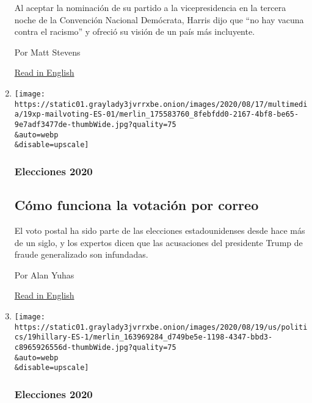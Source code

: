 \begin{enumerate}
  Al aceptar la nominación de su partido a la vicepresidencia en la
  tercera noche de la Convención Nacional Demócrata, Harris dijo que
  ``no hay vacuna contra el racismo'' y ofreció su visión de un país más
  incluyente.

  Por Matt Stevens

  \href{https://www.nytimes3xbfgragh.onion/2020/08/19/us/politics/kamala-harris-dnc-speech.html}{Read
  in English}
\item
  \href{/es/article/voto-por-correo.html}{}

  \texttt{[image: https://static01.graylady3jvrrxbe.onion/images/2020/08/17/multimedia/19xp-mailvoting-ES-01/merlin\_175583760\_8febfdd0-2167-4bf8-be65-9e7adf3477de-thumbWide.jpg?quality=75\\\&auto=webp\\\&disable=upscale]}

  \hypertarget{elecciones-2020-2}{%
  \subsubsection{Elecciones 2020}\label{elecciones-2020-2}}

  \hypertarget{cuxf3mo-funciona-la-votaciuxf3n-por-correo}{%
  \subsection{Cómo funciona la votación por
  correo}\label{cuxf3mo-funciona-la-votaciuxf3n-por-correo}}

  El voto postal ha sido parte de las elecciones estadounidenses desde
  hace más de un siglo, y los expertos dicen que las acusaciones del
  presidente Trump de fraude generalizado son infundadas.

  Por Alan Yuhas

  \href{https://www.nytimes3xbfgragh.onion/article/Vote-by-mail.html}{Read
  in English}
\item
  \href{/es/2020/08/19/espanol/estados-unidos/hillary-clinton-convencion.html}{}

  \texttt{[image: https://static01.graylady3jvrrxbe.onion/images/2020/08/19/us/politics/19hillary-ES-1/merlin\_163969284\_d749be5e-1198-4347-bbd3-c8965926556d-thumbWide.jpg?quality=75\\\&auto=webp\\\&disable=upscale]}

  \hypertarget{elecciones-2020-3}{%
  \subsubsection{Elecciones 2020}\label{elecciones-2020-3}}

  \hypertarget{hillary-clinton-en-la-convenciuxf3n-demuxf3crata-un-retorno-agridulce}{%
}
\end{enumerate}
